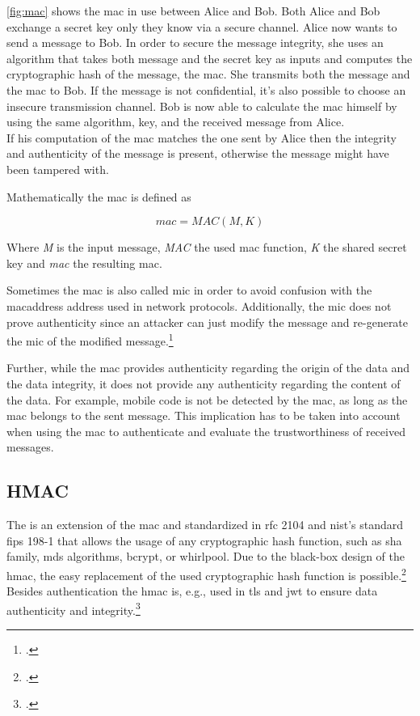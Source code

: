 \autoref{fig:mac} shows the \gls{mac} in use between Alice and Bob. Both Alice and Bob exchange a secret key only they know via a secure channel. Alice now wants to send a message to Bob. In order to secure the message integrity, she uses an algorithm that takes both message and the secret key as inputs and computes the cryptographic hash of the message, the \gls{mac}. She transmits both the message and the \gls{mac} to Bob. If the message is not confidential, it's also possible to choose an insecure transmission channel. Bob is now able to calculate the \gls{mac} himself by using the same algorithm, key, and the received message from Alice.\\
If his computation of the \gls{mac} matches the one sent by Alice then the integrity and authenticity of the message is present, otherwise the message might have been tampered with.

Mathematically the \gls{mac} is defined as

\begin{equation*}
	mac = MAC(M, K)
\end{equation*}

Where \textit{M} is the input message, \textit{MAC} the used \gls{mac} function, \textit{K} the shared secret key and \textit{mac} the resulting \glsdesc{mac}.

Sometimes the \gls{mac} is also called \gls{mic} in order to avoid confusion with the \gls{macaddress} address used in network protocols. Additionally, the \gls{mic} does not prove authenticity since an attacker can just modify the message and re-generate the \gls{mic} of the modified message.\footcites[See][60--62]{265831}

Further, while the \gls{mac} provides authenticity regarding the origin of the data and the data integrity, it does not provide any authenticity regarding the content of the data. For example, mobile code is not be detected by the \gls{mac}, as long as the \gls{mac} belongs to the sent message. This implication has to be taken into account when using the \gls{mac} to authenticate and evaluate the trustworthiness of received messages.

\subsection{HMAC}

The  is an extension of the \gls{mac} and standardized in \gls{rfc} 2104 and \gls{nist}'s standard \gls{fips} 198-1 that allows the usage of any cryptographic hash function, such as \gls{sha} family, \glspl{md} algorithms, bcrypt, or whirlpool. Due to the black-box design of the \gls{hmac}, the easy replacement of the used cryptographic hash function is possible.\footcites[See][]{krawczyk1997rfc}[See][]{FIPS198} Besides authentication the \gls{hmac} is, e.g., used in \gls{tls} and \gls{jwt} to ensure data authenticity and integrity.\footcites[See][14]{rfc5246}[See][8]{rfc7519}[See][3--4]{s2011rfc}

